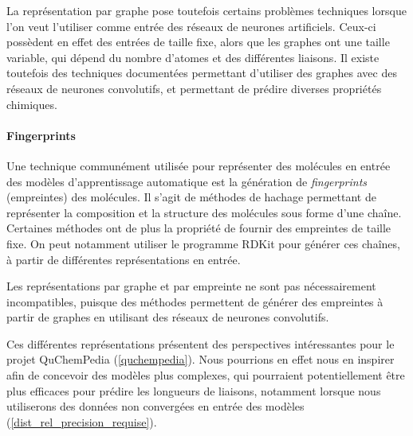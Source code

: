 \par La représentation par graphe pose toutefois certains problèmes techniques lorsque l'on veut l'utiliser comme entrée des réseaux de neurones artificiels. Ceux-ci possèdent en effet des entrées de taille fixe, alors que les graphes ont une taille variable, qui dépend du nombre d'atomes et des différentes liaisons. Il existe toutefois des techniques documentées permettant d'utiliser des graphes avec des réseaux de neurones convolutifs\cite{mg}, et permettant de prédire diverses propriétés chimiques\cite{jctc_prediction}. 
\paragraph{Fingerprints} Une technique communément utilisée pour représenter des molécules en entrée des modèles d'apprentissage automatique est la génération de \emph{fingerprints} (empreintes) des molécules. Il s'agit de méthodes de hachage permettant de représenter la composition et la structure des molécules sous forme d'une chaîne. Certaines méthodes ont de plus la propriété de fournir des empreintes de taille fixe. On peut notamment utiliser le programme RDKit\cite{rdkit} pour générer ces chaînes, à partir de différentes représentations en entrée.
\par Les représentations par graphe et par empreinte ne sont pas nécessairement incompatibles, puisque des méthodes permettent de générer des empreintes à partir de graphes en utilisant des réseaux de neurones convolutifs\cite{graph_fingerprint}.\\

\par Ces différentes représentations présentent des perspectives intéressantes pour le projet QuChemPedia (\ref{quchempedia}). Nous pourrions en effet nous en inspirer afin de concevoir des modèles plus complexes, qui pourraient potentiellement être plus efficaces pour prédire les longueurs de liaisons, notamment lorsque nous utiliserons des données non convergées en entrée des modèles (\ref{dist_rel_precision_requise}).





